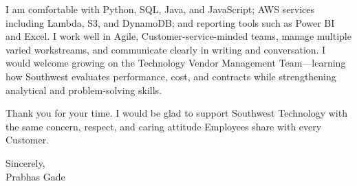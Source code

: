 \documentclass[letterpaper,11pt]{letter}
\begin{document}
I am comfortable with Python, SQL, Java, and JavaScript; AWS services including Lambda, S3, and DynamoDB; and reporting tools such as Power BI and Excel. I work well in Agile, Customer-service-minded teams, manage multiple varied workstreams, and communicate clearly in writing and conversation. I would welcome growing on the Technology Vendor Management Team---learning how Southwest evaluates performance, cost, and contracts while strengthening analytical and problem-solving skills.

Thank you for your time. I would be glad to support Southwest Technology with the same concern, respect, and caring attitude Employees share with every Customer.

Sincerely,\\
Prabhas Gade
\end{document}
